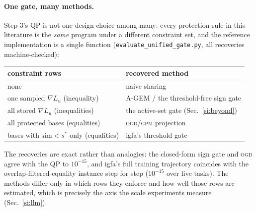 \documentclass[10pt,a4paper]{article}
\theoremstyle{plain}
\theoremstyle{definition}
\newcommand{\sstar}{s^{\ast}}
\newcommand{\IGFA}{igfa}
\newcommand{\OGD}{\textsc{ogd}}
\begin{document}
\paragraph{One gate, many methods.} Step 3's QP is not one design choice among many:
every protection rule in this literature is the \emph{same} program under a different
constraint set, and the reference implementation is a single function
(\texttt{evaluate\_unified\_gate.py}, all recoveries machine-checked):
\begin{center}\small
\begin{tabular}{ll}
\toprule
constraint rows & recovered method \\
\midrule
none & naive sharing \\
one sampled $\nabla L_u$ (inequality) & A-GEM / the threshold-free sign gate \\
all stored $\nabla L_u$ (inequalities) & the active-set gate (Sec.~\ref{si:beyond}) \\
all protected bases (equalities) & \OGD{}/\textsc{gpm} projection \\
bases with $\mathrm{sim}<\sstar$ only (equalities) & \IGFA's threshold gate \\
\bottomrule
\end{tabular}
\end{center}
The recoveries are exact rather than analogies: the closed-form sign gate and \OGD{}
agree with the QP to $10^{-15}$, and \IGFA's full training trajectory coincides with
the overlap-filtered-equality instance step for step ($10^{-15}$ over five tasks). The
methods differ only in which rows they enforce and how well those rows are estimated,
which is precisely the axis the scale experiments measure (Sec.~\ref{si:llm}).
\end{document}

